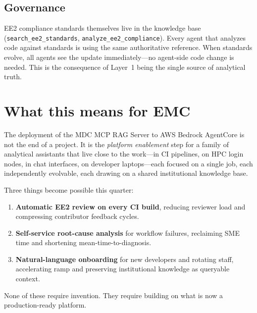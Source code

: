 \documentclass[11pt,letterpaper]{article}
\begin{document}
\subsection{Governance}

EE2 compliance standards themselves live in the knowledge base
(\texttt{search\_ee2\_standards}, \texttt{analyze\_ee2\_compliance}).
Every agent that analyzes code against standards is using the same
authoritative reference. When standards evolve, all agents see the
update immediately---no agent-side code change is needed. This is the
consequence of Layer~1 being the single source of analytical truth.

\section{What this means for EMC}

\begin{mdframed}[linecolor=ok, linewidth=0.8pt, backgroundcolor=paper,
                  leftmargin=0pt, rightmargin=0pt, innertopmargin=10pt,
                  innerbottommargin=10pt, innerleftmargin=12pt,
                  innerrightmargin=12pt, roundcorner=3pt]
The deployment of the MDC MCP RAG Server to AWS Bedrock AgentCore is not
the end of a project. It is the \emph{platform enablement} step for a
family of analytical assistants that live close to the work---in CI
pipelines, on HPC login nodes, in chat interfaces, on developer
laptops---each focused on a single job, each independently evolvable,
each drawing on a shared institutional knowledge base.

Three things become possible this quarter:

\begin{enumerate}[leftmargin=*, itemsep=2pt]
  \item \textbf{Automatic EE2 review on every CI build}, reducing
        reviewer load and compressing contributor feedback cycles.
  \item \textbf{Self-service root-cause analysis} for workflow failures,
        reclaiming SME time and shortening mean-time-to-diagnosis.
  \item \textbf{Natural-language onboarding} for new developers and
        rotating staff, accelerating ramp and preserving institutional
        knowledge as queryable context.
\end{enumerate}

None of these require invention. They require building on what is now
a production-ready platform.
\end{mdframed}
\end{document}
